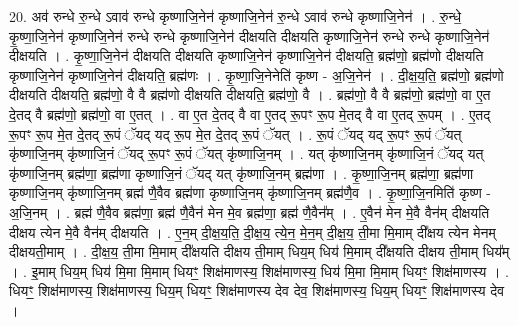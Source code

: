 \documentclass[17pt]{extarticle}
\begin{document}
20. अव॑ रुन्धे रु॒न्धे ऽवाव॑ रुन्धे कृष्णाजि॒नेन॑ कृष्णाजि॒नेन॑ रु॒न्धे ऽवाव॑ रुन्धे कृष्णाजि॒नेन॑ । . रु॒न्धे॒ कृ॒ष्णा॒जि॒नेन॑ कृष्णाजि॒नेन॑ रुन्धे रुन्धे कृष्णाजि॒नेन॑ दीक्षयति दीक्षयति कृष्णाजि॒नेन॑ रुन्धे रुन्धे कृष्णाजि॒नेन॑ दीक्षयति । . कृ॒ष्णा॒जि॒नेन॑ दीक्षयति दीक्षयति कृष्णाजि॒नेन॑ कृष्णाजि॒नेन॑ दीक्षयति॒ ब्रह्म॑णो॒ ब्रह्म॑णो दीक्षयति कृष्णाजि॒नेन॑ कृष्णाजि॒नेन॑ दीक्षयति॒ ब्रह्म॑णः । . कृ॒ष्णा॒जि॒नेनेति॑ कृष्ण - अ॒जि॒नेन॑ । . दी॒क्ष॒य॒ति॒ ब्रह्म॑णो॒ ब्रह्म॑णो दीक्षयति दीक्षयति॒ ब्रह्म॑णो॒ वै वै ब्रह्म॑णो दीक्षयति दीक्षयति॒ ब्रह्म॑णो॒ वै । . ब्रह्म॑णो॒ वै वै ब्रह्म॑णो॒ ब्रह्म॑णो॒ वा ए॒त दे॒तद् वै ब्रह्म॑णो॒ ब्रह्म॑णो॒ वा ए॒तत् । . वा ए॒त दे॒तद् वै वा ए॒तद् रू॒पꣳ रू॒प मे॒तद् वै वा ए॒तद् रू॒पम् । . ए॒तद् रू॒पꣳ रू॒प मे॒त दे॒तद् रू॒पं ॅयद् यद् रू॒प मे॒त दे॒तद् रू॒पं ॅयत् । . रू॒पं ॅयद् यद् रू॒पꣳ रू॒पं ॅयत् कृ॑ष्णाजि॒नम् कृ॑ष्णाजि॒नं ॅयद् रू॒पꣳ रू॒पं ॅयत् कृ॑ष्णाजि॒नम् । . यत् कृ॑ष्णाजि॒नम् कृ॑ष्णाजि॒नं ॅयद् यत् कृ॑ष्णाजि॒नम् ब्रह्म॑णा॒ ब्रह्म॑णा कृष्णाजि॒नं ॅयद् यत् कृ॑ष्णाजि॒नम् ब्रह्म॑णा । . कृ॒ष्णा॒जि॒नम् ब्रह्म॑णा॒ ब्रह्म॑णा कृष्णाजि॒नम् कृ॑ष्णाजि॒नम् ब्रह्म॑ णै॒वैव ब्रह्म॑णा कृष्णाजि॒नम् कृ॑ष्णाजि॒नम् ब्रह्म॑णै॒व । . कृ॒ष्णा॒जि॒नमिति॑ कृष्ण - अ॒जि॒नम् । . ब्रह्म॑ णै॒वैव ब्रह्म॑णा॒ ब्रह्म॑ णै॒वैन॑ मेन मे॒व ब्रह्म॑णा॒ ब्रह्म॑ णै॒वैन᳚म् । . ए॒वैन॑ मेन मे॒वै वैन॑म् दीक्षयति दीक्षय त्येन मे॒वै वैन॑म् दीक्षयति । . ए॒न॒म् दी॒क्ष॒य॒ति॒ दी॒क्ष॒य॒ त्ये॒न॒ मे॒न॒म् दी॒क्ष॒य॒ ती॒मा मि॒माम् दी᳚क्षय त्येन मेनम् दीक्षयती॒माम् । . दी॒क्ष॒य॒ ती॒मा मि॒माम् दी᳚क्षयति दीक्षय ती॒माम् धिय॒म् धिय॑ मि॒माम् दी᳚क्षयति दीक्षय ती॒माम् धिय᳚म् । . इ॒माम् धिय॒म् धिय॑ मि॒मा मि॒माम् धियꣳ॒॒ शिक्ष॑माणस्य॒ शिक्ष॑माणस्य॒ धिय॑ मि॒मा मि॒माम् धियꣳ॒॒ शिक्ष॑माणस्य । . धियꣳ॒॒ शिक्ष॑माणस्य॒ शिक्ष॑माणस्य॒ धिय॒म् धियꣳ॒॒ शिक्ष॑माणस्य देव देव॒ शिक्ष॑माणस्य॒ धिय॒म् धियꣳ॒॒ शिक्ष॑माणस्य देव । \newline
\end{document}
